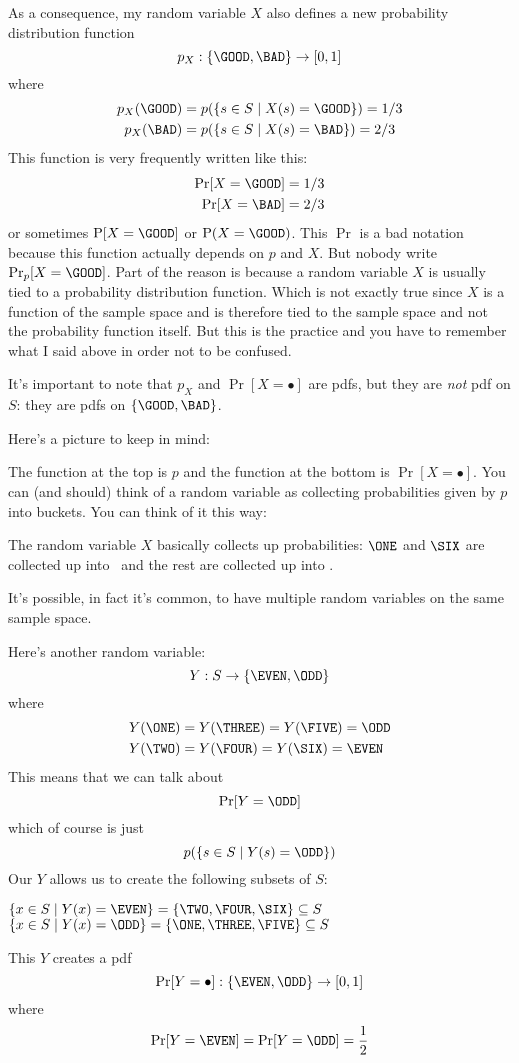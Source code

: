 As a consequence, my random variable $X$ also defines a new
probability distribution function
\[
  p_X : \{ \GOOD, \BAD \} \rightarrow [0,1]
\]
where
\begin{align*}
  p_X(\GOOD) &= p(\{ s \in S \mid X(s) = \GOOD \}) = 1/3 \\
  p_X(\BAD) &= p(\{ s \in S \mid X(s) = \BAD \}) = 2/3
\end{align*}
This function is very frequently written like this:
\begin{align*}
  \Pr[X = \GOOD] &= 1/3 \\
  \Pr[X = \BAD] &= 2/3
\end{align*}
or sometimes
$\operatorname{P}[X=\GOOD]$
or
$\operatorname{P}(X=\GOOD)$.
This $\Pr$ is a bad notation because this function
actually depends on $p$ and $X$.
But nobody write $\Pr_p[X = \GOOD]$.
Part of the reason is because a random variable $X$
is usually tied to a probability distribution function.
Which is not exactly true since $X$ is a function of
the sample space and is therefore tied to the sample space
and not the probability function itself.
But this is the practice and you have to remember what I said
above in order not to be confused.

It's important to note that $p_X$ and $\Pr[X= \bullet]$ are pdfs,
but they are \textit{not} pdf on $S$: they are pdfs on
$\{ \GOOD, \BAD \}$.

Here's a picture to keep in mind:


The function at the top is $p$ and the function
at the bottom is $\Pr[X = \bullet]$.
You can (and should) think of a random variable as
collecting probabilities given by $p$ into buckets.
You can think of it this way:



The random variable $X$ basically collects up probabilities:
$\ONE$ and $\SIX$ are collected up into \GOOD\
and the rest are collected up into \BAD.

It's possible, in fact it's common, to have multiple
random variables on the same sample space.

Here's another random variable:
\[
Y : S \rightarrow \{ \EVEN, \ODD \}
\]
where
\begin{align*}
Y(\ONE) &= Y(\THREE) = Y(\FIVE) = \ODD \\
Y(\TWO) &= Y(\FOUR) = Y(\SIX) = \EVEN
\end{align*}
This means that we can talk about
\[
\Pr[Y = \ODD]
\]
which of course is just
\[
p(\{s \in S \mid Y(s) = \ODD \})
\]
Our $Y$ allows us to create the following subsets of $S$:
\begin{myenum}
  \li $\{ x \in S \mid Y(x) = \EVEN \} = \{\TWO, \FOUR, \SIX \} \subseteq S$
  \li $\{ x \in S \mid Y(x) = \ODD \} = \{\ONE, \THREE, \FIVE \} \subseteq S$
\end{myenum}
This $Y$ creates a pdf
\[
  \Pr[Y = \bullet] : \{ \EVEN, \ODD \} \rightarrow [0, 1]
\]
where
\[
  \Pr[Y = \EVEN] = \Pr[Y = \ODD] = \frac{1}{2}
\]

